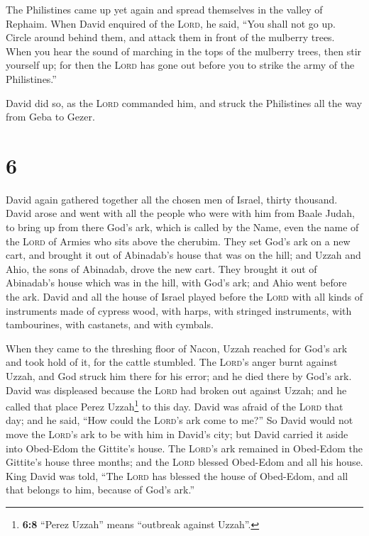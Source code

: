  The Philistines came up yet again and spread themselves
in the valley of Rephaim.  When David enquired of the
\textsc{Lord}, he said, ``You shall not go up. Circle around behind
them, and attack them in front of the mulberry trees. 
When you hear the sound of marching in the tops of the mulberry trees,
then stir yourself up; for then the \textsc{Lord} has gone out before
you to strike the army of the Philistines.''

 David did so, as the \textsc{Lord} commanded him, and
struck the Philistines all the way from Geba to Gezer.

\hypertarget{section-5}{%
\section{6}\label{section-5}}

 David again gathered together all the chosen men of
Israel, thirty thousand.  David arose and went with all
the people who were with him from Baale Judah, to bring up from there
God's ark, which is called by the Name, even the name of the
\textsc{Lord} of Armies who sits above the cherubim.  They
set God's ark on a new cart, and brought it out of Abinadab's house that
was on the hill; and Uzzah and Ahio, the sons of Abinadab, drove the new
cart.  They brought it out of Abinadab's house which was
in the hill, with God's ark; and Ahio went before the ark.
 David and all the house of Israel played before the
\textsc{Lord} with all kinds of instruments made of cypress wood, with
harps, with stringed instruments, with tambourines, with castanets, and
with cymbals.

 When they came to the threshing floor of Nacon, Uzzah
reached for God's ark and took hold of it, for the cattle stumbled.
 The \textsc{Lord}'s anger burnt against Uzzah, and God
struck him there for his error; and he died there by God's ark.
 David was displeased because the \textsc{Lord} had broken
out against Uzzah; and he called that place Perez Uzzah\footnote{\textbf{6:8}
  ``Perez Uzzah'' means ``outbreak against Uzzah''.} to this day.
 David was afraid of the \textsc{Lord} that day; and he
said, ``How could the \textsc{Lord}'s ark come to me?'' 
So David would not move the \textsc{Lord}'s ark to be with him in
David's city; but David carried it aside into Obed-Edom the Gittite's
house.  The \textsc{Lord}'s ark remained in Obed-Edom the
Gittite's house three months; and the \textsc{Lord} blessed Obed-Edom
and all his house.  King David was told, ``The
\textsc{Lord} has blessed the house of Obed-Edom, and all that belongs
to him, because of God's ark.''

